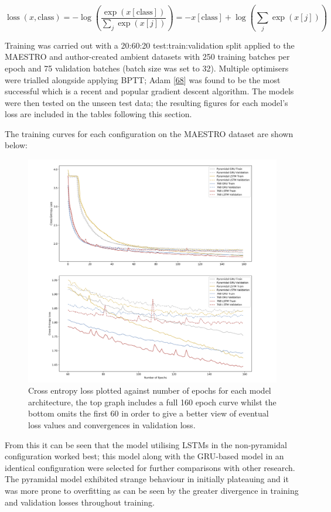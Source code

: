 \documentclass[12pt,]{article}
\begin{document}
\[
\operatorname{loss}(x, \text {class})=-\log \left(\frac{\exp (x[\text{class}])}{\sum_{j} \exp (x[j])}\right)=-x[\text {class}]+\log \left(\sum_{j} \exp (x[j])\right)
\]

Training was carried out with a 20:60:20 test:train:validation split
applied to the MAESTRO and author-created ambient datasets with 250
training batches per epoch and 75 validation batches (batch size was set
to 32). Multiple optimisers were trialled alongside applying BPTT; Adam
{[}\protect\hyperlink{ref-kingma2014adam}{68}{]} was found to be the
most successful which is a recent and popular gradient descent
algorithm. The models were then tested on the unseen test data; the
resulting figures for each model's loss are included in the tables
following this section.

The training curves for each configuration on the MAESTRO dataset are
shown below:

\begin{figure}
\centering
\includegraphics{Images/loss.png}
\caption{Cross entropy loss plotted against number of epochs for each
model architecture, the top graph includes a full 160 epoch curve whilst
the bottom omits the first 60 in order to give a better view of eventual
loss values and convergences in validation loss.}
\end{figure}

From this it can be seen that the model utilising LSTMs in the
non-pyramidal configuration worked best; this model along with the
GRU-based model in an identical configuration were selected for further
comparisons with other research. The pyramidal model exhibited strange
behaviour in initially plateauing and it was more prone to overfitting
as can be seen by the greater divergence in training and validation
losses throughout training.
\end{document}
